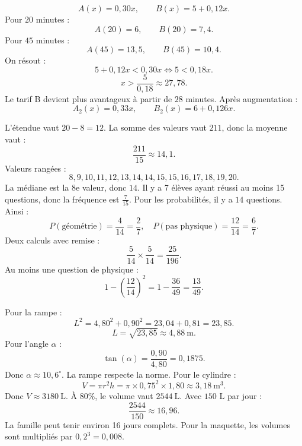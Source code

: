 \documentclass[11pt,a4paper]{article}
\newcounter{correction}
\begin{document}
\begin{correction}[M-LONG-02]
\[
A(x)=0{,}30x,\qquad B(x)=5+0{,}12x.
\]
Pour $20$ minutes :
\[
A(20)=6,\qquad B(20)=7{,}4.
\]
Pour $45$ minutes :
\[
A(45)=13{,}5,\qquad B(45)=10{,}4.
\]
On résout :
\[
5+0{,}12x<0{,}30x \Longleftrightarrow 5<0{,}18x.
\]
\[
x>\frac{5}{0{,}18}\approx27{,}78.
\]
Le tarif B devient plus avantageux à partir de $28$ minutes. Après augmentation :
\[
A_2(x)=0{,}33x,\qquad B_2(x)=6+0{,}126x.
\]
\end{correction}

\begin{correction}[M-LONG-03]
L'étendue vaut $20-8=12$. La somme des valeurs vaut $211$, donc la moyenne vaut :
\[
\frac{211}{15}\approx14{,}1.
\]
Valeurs rangées :
\[
8,9,10,11,12,13,14,14,15,15,16,17,18,19,20.
\]
La médiane est la 8e valeur, donc $14$. Il y a 7 élèves ayant réussi au moins 15 questions, donc la fréquence est $\frac{7}{15}$.
Pour les probabilités, il y a $14$ questions. Ainsi :
\[
P(\text{géométrie})=\frac{4}{14}=\frac27,
\quad
P(\text{pas physique})=\frac{12}{14}=\frac67.
\]
Deux calculs avec remise :
\[
\frac{5}{14}\times\frac{5}{14}=\frac{25}{196}.
\]
Au moins une question de physique :
\[
1-\left(\frac{12}{14}\right)^2=1-\frac{36}{49}=\frac{13}{49}.
\]
\end{correction}

\begin{correction}[M-LONG-04]
Pour la rampe :
\[
L^2=4{,}80^2+0{,}90^2=23{,}04+0{,}81=23{,}85.
\]
\[
L=\sqrt{23{,}85}\approx4{,}88\ \mathrm{m}.
\]
Pour l'angle $\alpha$ :
\[
\tan(\alpha)=\frac{0{,}90}{4{,}80}=0{,}1875.
\]
Donc $\alpha\approx10{,}6^\circ$. La rampe respecte la norme. Pour le cylindre :
\[
V=\pi r^2h=\pi\times0{,}75^2\times1{,}80\approx3{,}18\ \mathrm{m^3}.
\]
Donc $V\approx3180\ \mathrm{L}$. À $80\%$, le volume vaut $2544\ \mathrm{L}$. Avec $150$ L par jour :
\[
\frac{2544}{150}\approx16{,}96.
\]
La famille peut tenir environ 16 jours complets. Pour la maquette, les volumes sont multipliés par $0{,}2^3=0{,}008$.
\end{correction}
\end{document}
